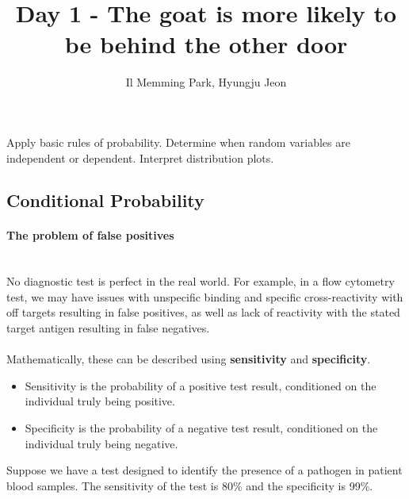 \documentclass[a4paper,11pt]{exam}
\title{Day 1 - The goat is more likely to be behind the other door}
\author{Il Memming Park, Hyungju Jeon}
\newcounter{ct}
\newcommand{\myparagraph}[1]{\paragraph{#1}\mbox{}\\}
\begin{document}
\maketitle
\begin{tcolorbox}[colback=black!1!,title=Learning Objective 1]
	Apply basic rules of probability. Determine when random variables are independent or dependent. Interpret distribution plots.
\end{tcolorbox}

\subsection{Conditional Probability}

\myparagraph{The problem of false positives} No diagnostic test is perfect in the real world.
For example, in a flow cytometry test, we may have issues with unspecific binding and specific cross-reactivity with off targets
resulting in false positives, as well as lack of reactivity with the stated target antigen resulting in false negatives.
\\\\
Mathematically, these can be described using \textbf{sensitivity} and \textbf{specificity}.
\begin{itemize}
	\item Sensitivity is the probability of a positive test result, conditioned on the individual truly being positive.
	\item Specificity is the probability of a negative test result, conditioned on the individual truly being negative.
\end{itemize}

Suppose we have a test designed to identify the presence of a pathogen in patient blood samples. The sensitivity of the test is 80\% and the specificity is 99\%.
\end{document}
